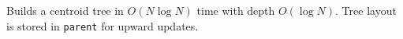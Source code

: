 
Builds a centroid tree in $O(N \log N)$ time with depth $O(\log N)$. Tree layout is stored in \lstinline|parent| for upward updates.


